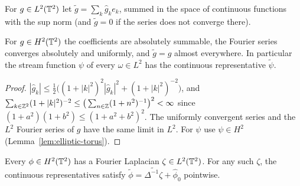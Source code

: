 \begin{definition}
\label{def:continuous-representative}
\leanok
For $g\in L^2(\mathbb{T}^2)$ let $\tilde g=\sum_k\hat g_ke_k$, summed in the space of continuous
functions with the sup norm (and $\tilde g=0$ if the series does not converge there).
\end{definition}

\begin{lemma}
\label{lem:continuous-representative}
\leanok
For $g\in H^2(\mathbb{T}^2)$ the coefficients are absolutely summable, the Fourier series
converges absolutely and uniformly, and $\tilde g=g$ almost everywhere. In particular
the stream function $\psi$ of every $\omega\in L^2$ has the continuous representative
$\tilde\psi$.
\end{lemma}

\begin{proof}
\leanok
$|\hat g_k|\le\frac12\big((1+|k|^2)^2|\hat g_k|^2+(1+|k|^2)^{-2}\big)$, and
$\sum_{k\in\mathbb{Z}^2}(1+|k|^2)^{-2}\le\big(\sum_{n\in\mathbb{Z}}(1+n^2)^{-1}\big)^2<\infty$ since
$(1+a^2)(1+b^2)\le(1+a^2+b^2)^2$. The uniformly convergent series and the $L^2$ Fourier
series of $g$ have the same limit in $L^2$. For $\psi$ use $\psi\in H^2$
(Lemma~\ref{lem:elliptic-torus}).
\end{proof}

\begin{lemma}
\label{lem:h2-laplacian-reconstruction}
\leanok
Every $\phi\in H^2(\mathbb{T}^2)$ has a Fourier Laplacian $\zeta\in L^2(\mathbb{T}^2)$.
For any such $\zeta$, the continuous representatives satisfy
$\widetilde\phi=\widetilde{\Delta^{-1}\zeta}+\hat\phi_0$ pointwise.
\end{lemma}

